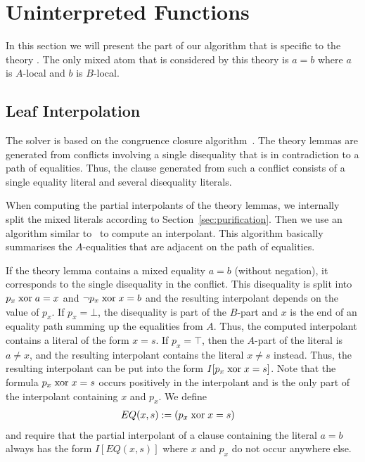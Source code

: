\section{Uninterpreted Functions}
In this section we will present the part of our algorithm that is
specific to the theory \euf.  The only mixed atom that is considered
by this theory is $a=b$ where $a$ is $A$-local and $b$ is $B$-local.

\subsection{Leaf Interpolation}

The \euf solver is based on the congruence closure
algorithm~\cite{Detlefs2005}. The theory lemmas are generated from
conflicts involving a single disequality that is in contradiction to a
path of equalities.  Thus, the clause generated from such a conflict
consists of a single equality literal and several disequality
literals.

When computing the partial interpolants of the theory lemmas, we
internally split the mixed literals according to
Section~\ref{sec:purification}.  Then we use an algorithm similar
to~\cite{Fuchs2009} to compute an interpolant.  This algorithm
basically summarises the $A$-equalities that are adjacent on the path
of equalities.  

\ifnewinterpolation
If the theory lemma contains a mixed equality $a=b$ (without negation),
it corresponds to the single
disequality in the conflict.  
This disequality is split into $p_x \mathrel{\mbox{xor}} a=x$ and $\lnot p_x \mathrel{\mbox{xor}} x= b$
and the resulting interpolant depends on the value of $p_x$.  If $p_x=\bot$,
the disequality is part of the $B$-part and $x$ is the
end of an equality path summing up the equalities from $A$.
Thus, the computed interpolant contains a literal of the form $x=s$.
If $p_x=\top$, then the $A$-part of the literal is $a \neq x$, and the
resulting interpolant contains the literal $x\neq s$ instead.
Thus, the resulting interpolant can be put into the form $I[p_x \mathrel{\mbox{xor}} x=s]$.
Note that the formula $p_x\mathrel{\mbox{xor}} x=s$ occurs positively in the
interpolant and is the only part of the interpolant containing $x$ and $p_x$.
We define
\begin{align*}
  EQ(x,s) &:= (p_x \mathrel{\mbox{xor}} x = s)
\end{align*}
and require that the partial interpolant of a clause containing the
literal $a=b$ always has the form $I[EQ(x,s)]$ where $x$ and $p_x$ do not
occur anywhere else.

